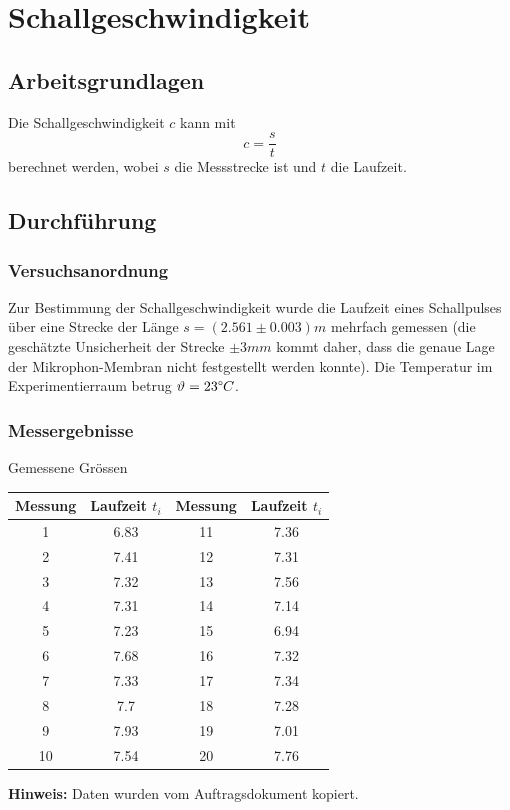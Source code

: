 \section{Schallgeschwindigkeit}

\subsection{Arbeitsgrundlagen}

Die Schallgeschwindigkeit $c$ kann mit
\[c=\frac{s}{t}\]
berechnet werden, wobei $s$ die Messstrecke ist und $t$ die Laufzeit.


\subsection{Durchf\"{u}hrung}

\subsubsection*{Versuchsanordnung}

Zur Bestimmung der Schallgeschwindigkeit wurde die Laufzeit eines Schallpulses \"{u}ber eine Strecke
der L\"{a}nge $s = (2.561 \pm 0.003) m$ mehrfach gemessen (die gesch\"{a}tzte Unsicherheit der Strecke $\pm 3 mm$
kommt daher, dass die genaue Lage der Mikrophon-Membran nicht festgestellt werden konnte). Die
Temperatur im Experimentierraum betrug $\vartheta=23 \degree C$.


\subsubsection*{Messergebnisse}

\begin{threeparttable}
    \caption{Gemessene Gr\"{o}ssen}
    \begin{tabular}{cccc}
        \toprule
        Messung & Laufzeit $t_i$ & Messung & Laufzeit $t_i$ \\
        \midrule
        1  & 6.83 & 11 & 7.36 \\
        2  & 7.41 & 12 & 7.31 \\
        3  & 7.32 & 13 & 7.56 \\
        4  & 7.31 & 14 & 7.14 \\
        5  & 7.23 & 15 & 6.94 \\
        6  & 7.68 & 16 & 7.32 \\
        7  & 7.33 & 17 & 7.34 \\
        8  & 7.7  & 18 & 7.28 \\
        9  & 7.93 & 19 & 7.01 \\
        10 & 7.54 & 20 & 7.76 \\
       \bottomrule
    \end{tabular}
    \begin{tablenotes}
        \small
        \item \textbf{Hinweis:} Daten wurden vom Auftragsdokument kopiert.
    \end{tablenotes}
\end{threeparttable}


